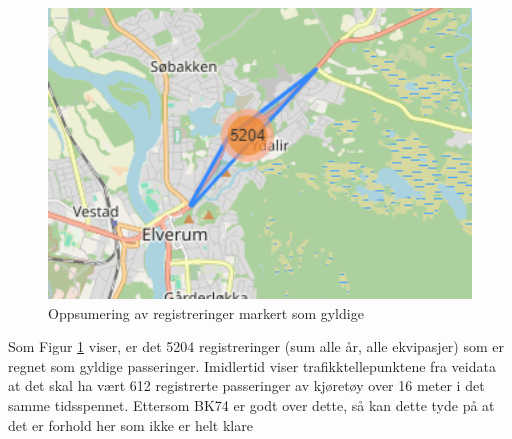 \documentclass{article}
\begin{document}
\begin{figure}[H]
    \centering
    \includegraphics[width=1\textwidth]{./figures/markerclusters.png}
    \caption{Oppsumering av registreringer markert som gyldige}
    \label{fig:markerclusters}
\end{figure}

Som Figur \ref{fig:markerclusters} viser, er det 5204 registreringer (sum alle år, alle ekvipasjer) som er regnet som gyldige passeringer.
Imidlertid viser trafikktellepunktene fra veidata at det skal ha vært 612 registrerte passeringer av kjøretøy over 16 meter i det samme tidsspennet.
Ettersom BK74 er godt over dette, så kan dette tyde på at det er forhold her som ikke er helt klare
\end{document}
